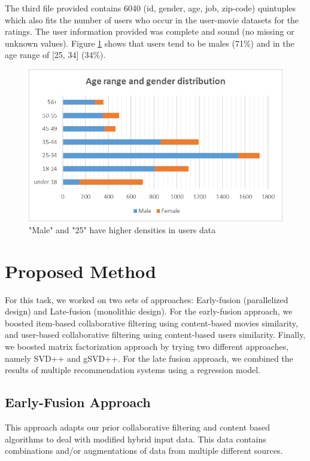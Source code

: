 \documentclass{sigish}
\begin{document}
The third file provided contains 6040 (id, gender, age, job, zip-code) quintuples which also fits the number of users who occur in the user-movie datasets for the ratings. The user information provided was complete and sound (no missing or unknown values). Figure \ref{fig:agerangegender} shows that users tend to be males (71\%) and in the age range of [25, 34] (34\%).

\begin{figure}
\centering
\includegraphics[width=\columnwidth]{images/agerange_gender.png}
\caption{"Male" and "25" have higher densities in users data}
\label{fig:agerangegender}
\end{figure}

\section{Proposed Method}

For this task, we worked on two sets of approaches: Early-fusion (parallelized design) and Late-fusion (monolithic design). For the early-fusion approach, we boosted item-based collaborative filtering using content-based movies similarity, and user-based collaborative filtering using content-based users similarity.  Finally, we boosted matrix factorization approach by trying two different approaches, namely SVD++ and gSVD++.
For the late fusion approach, we combined the results of multiple recommendation systems using a regression model.

\subsection{Early-Fusion Approach}

This approach adapts our prior collaborative filtering and content based algorithms to deal with modified hybrid input data. This data contains combinations and/or augmentations of data from multiple different sources.
\end{document}
